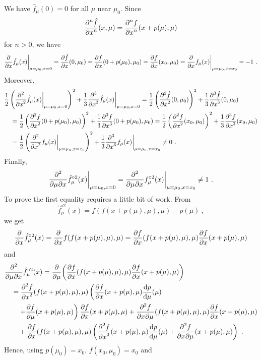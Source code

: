 \begin{rmk}
We have $\hat{f}_\mu(0)=0$ for all $\mu$ near $\mu_0$.  Since
\[
  \pdydxn{\hat{f}}{x}{n}(x,\mu) = \pdydxn{f}{x}{n}(x+p(\mu),\mu)
\]
for $n>0$, we have
\[
\pdfdx{\hat{f}_{\mu}(x)}{x}\bigg|_{\mu=\mu_0,x=0}
= \pdydx{\hat{f}}{x}(0,\mu_0)
= \pdydx{f}{x}(0+p(\mu_0),\mu_0)
= \pdydx{f}{x}(x_0,\mu_0)
= \pdfdx{f_{\mu}(x)}{x} \bigg|_{\mu=\mu_0,x=x_0} = -1 \ .
\]
Moreover,
\begin{align*}
&\frac{1}{2}
\left(\pdfdxn{\hat{f}_{\mu}(x)}{x}{2}\bigg|_{\mu=\mu_0,x=0}\right)^2
+\frac{1}{3} \pdfdxn{\hat{f}_{\mu}(x)}{x}{3}\bigg|_{\mu=\mu_0,x=0}
= 
\frac{1}{2} \left(\pdydxn{\hat{f}}{x}{2}(0,\mu_0) \right)^2
+\frac{1}{3} \pdydxn{\hat{f}}{x}{3}(0,\mu_0) \\
&\quad = \frac{1}{2} \left(\pdydxn{f}{x}{2}(0+p(\mu_0),\mu_0) \right)^2
+\frac{1}{3} \pdydxn{f}{x}{3}(0+p(\mu_0),\mu_0)
= \frac{1}{2} \left(\pdydxn{f}{x}{2}(x_0,\mu_0) \right)^2
+\frac{1}{3} \pdydxn{f}{x}{3}(x_0,\mu_0) \\
&\quad =\frac{1}{2}
\left(\pdfdxn{f_{\mu}(x)}{x}{2}\bigg|_{\mu=\mu_0,x=x_0}\right)^2
+\frac{1}{3} \pdfdxn{f_{\mu}(x)}{x}{3}\bigg|_{\mu=\mu_0,x=x_0} \neq 0 \ .
\end{align*}
Finally,
\begin{equation}\label{per_db_sc}
\pdfdxnm{\hat{f}_{\mu}^{\circ 2}(x)}{\mu}{x}{2}{}{}\bigg|_{\mu=\mu_0,x=0}
= \pdfdxnm{f_{\mu}^{\circ 2}(x)}{\mu}{x}{2}{}{}\bigg|_{\mu=\mu_0,x=x_0} \neq 1 \ .
\end{equation}
To prove the first equality requires a little bit of work.  From
\[
\hat{f}_{\mu}^{\circ 2}(x) = f(f(x+p(\mu),\mu),\mu)-p(\mu) \  ,
\]
we get
\[
\pdfdx{\hat{f}_{\mu}^{\circ 2}(x)}{x} = \pdfdx{f(f(x+p(\mu),\mu),\mu)}{x} 
= \pdydx{f}{x}(f(x+p(\mu),\mu),\mu) \pdydx{f}{x}(x+p(\mu),\mu)
\]
and
\begin{align*}
&\pdfdxnm{\hat{f}_{\mu}^{\circ 2}(x)}{\mu}{x}{2}{}{}
= \pdfdx{\left( \pdydx{f}{x}(f(x+p(\mu),\mu),\mu)
\pdydx{f}{x}(x+p(\mu),\mu) \right)}{\mu}  \\
&\quad = \pdydxn{f}{x}{2}(f(x+p(\mu),\mu),\mu)
\left( \pdydx{f}{x}(x+p(\mu),\mu) \dydx{p}{\mu} (\mu) \right. \\
&\qquad \left. + \pdydx{f}{\mu}(x+p(\mu),\mu) \right)
\pdydx{f}{x}(x+p(\mu),\mu)
+ \pdydxnm{f}{x}{\mu}{2}{}{}(f(x+p(\mu),\mu),\mu)
\pdydx{f}{x}(x+p(\mu),\mu)\\
&\qquad +\pdydx{f}{x}(f(x+p(\mu),\mu),\mu)
\left( \pdydxn{f}{x}{2}(x+p(\mu),\mu) \dydx{p}{\mu}(\mu)
+ \pdydxnm{f}{x}{\mu}{2}{}{}(x+p(\mu),\mu) \right) \ .
\end{align*}
Hence, using $p(\mu_0) = x_0$, $f(x_0,\mu_0)=x_0$ and

\end{rmk}
